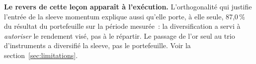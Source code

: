 \begin{insightbox}
\textbf{Le revers de cette leçon apparaît à l'exécution.} L'orthogonalité qui justifie l'entrée de la sleeve momentum explique aussi qu'elle porte, à elle seule, 87,0\,\% du résultat du portefeuille sur la période mesurée~: la diversification a servi à \emph{autoriser} le rendement visé, pas à le répartir. Le passage de l'or seul au trio d'instruments a diversifié la sleeve, pas le portefeuille. Voir la section~\ref{sec:limitations}.
\end{insightbox}
